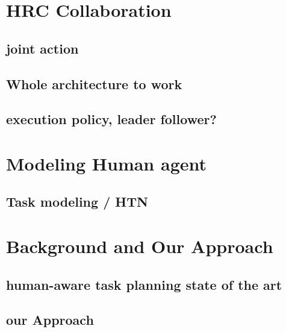 \section{HRC Collaboration}

\subsection{joint action}
\subsection{Whole architecture to work}
\subsection{execution policy, leader follower?}

\section{Modeling Human agent}
\subsection{Task modeling / HTN}

\section{Background and Our Approach}
\subsection{human-aware task planning state of the art}
\subsection{our Approach}


